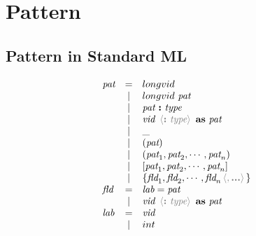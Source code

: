 \documentclass[11pt,a4paper]{article}
\newcommand{\key}[1]{\textrm{\textbf{#1}}}
\newcommand{\prodlhs}[1]{\textit{#1}}
\newcommand{\braced}[1]{\{#1\}}
\newcommand{\angled}[1]{\,{\color{gray}\langle#1\rangle}\,}
\begin{document}
\section {Pattern}
\subsection {Pattern in Standard ML}
{\renewcommand{\arraystretch}{1.2}\[
\begin{array}{lcll}
\prodlhs{pat}
    & = & longvid                                                                   &\\        
    & | & longvid \ \prodlhs{pat}                                                   &\\
    & | & \prodlhs{pat}\ \key{:}\ \prodlhs{type}                                    &\\
    & | & \prodlhs{vid}\ \angled{\key{:}\ \prodlhs{type}}\ \key{as}\ \prodlhs{pat}  &\\
    & | & \_                                                                        &\\
    & | & (\prodlhs{pat})                                                           &\\
    & | & (\prodlhs{pat}_1,\prodlhs{pat}_2,\cdots,\prodlhs{pat}_n)                  &\\
    & | & [\prodlhs{pat}_1,\prodlhs{pat}_2,\cdots,\prodlhs{pat}_n]                  &\\
    & | & \braced{\prodlhs{fld}_1,\prodlhs{fld}_2,\cdots,\prodlhs{fld}_n\angled{,\key{...}}}  &\\
\prodlhs{fld}
    & = & \prodlhs{lab} = \prodlhs{pat}                                             &\\
    & | & \prodlhs{vid}\ \angled{\key{:}\ \prodlhs{type}}\ \key{as}\ \prodlhs{pat}  &\\
\prodlhs{lab}
    & = & \prodlhs{vid}                                                             &\\
    & | & int                                                                       &\\    
\end{array}
\]}
\end{document}
